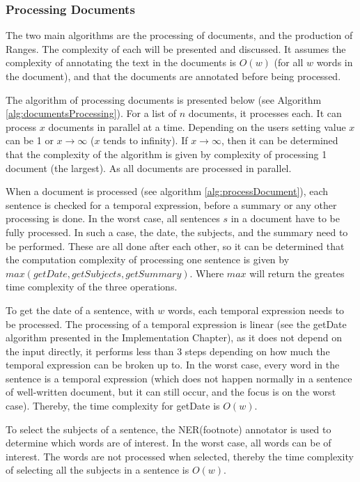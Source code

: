 \subsubsection{Processing Documents}
\par The two main algorithms are the processing of documents, and the production of Ranges. The complexity of each will be presented and discussed. It assumes the complexity of annotating the text in the documents is $O(w)$ (for all $w$ words in the document), and that the documents are annotated before being processed.
\par The algorithm of processing documents is presented below (see Algorithm \ref{alg:documentsProcessing}). For a list of $n$ documents, it processes each. It can process $x$ documents in parallel at a time. Depending on the users setting value $x$ can be 1 or ${x\to\infty}$ ($x$ tends to infinity). If ${x\to\infty}$, then it can be determined that the complexity of the algorithm is given by complexity of processing 1 document (the largest). As all documents are processed in parallel. \par When a document is processed (see algorithm \ref{alg:processDocument}), each sentence is checked for a temporal expression, before a summary or any other processing is done. In the worst case, all sentences $s$ in a document have to be fully processed. In such a case, the date, the subjects, and the summary need to be performed. These are all done after each other, so it can be determined that the computation complexity of processing one sentence is given by $max(getDate, getSubjects, getSummary)$. Where $max$ will return the greates time complexity of the three operations. 
\par To get the date of a sentence, with $w$ words, each temporal expression needs to be processed. The processing of a temporal expression is linear (see the getDate algorithm presented in the Implementation Chapter), as it does not depend on the input directly, it performs less than 3 steps depending on how much the temporal expression can be broken up to. In the worst case, every word in the sentence is a temporal expression (which does not happen normally in a sentence of well-written document, but it can still occur, and the focus is on the worst case). Thereby, the time complexity for getDate is $O(w)$.
\par To select the subjects of a sentence, the NER(footnote) annotator is used to determine which words are of interest. In the worst case, all words can be of interest. The words are not processed when selected, thereby the time complexity of selecting all the subjects in a sentence is $O(w)$.
